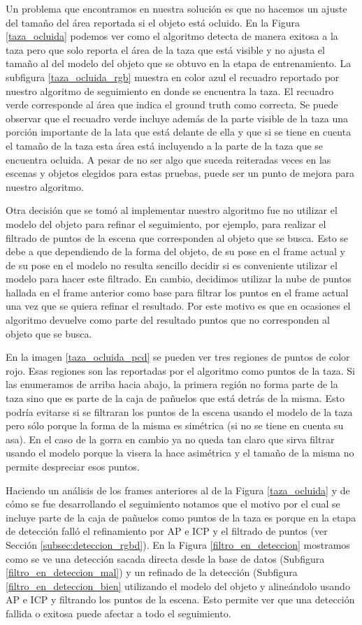 Un problema que encontramos en nuestra solución es que no hacemos un ajuste del tamaño del área reportada si el objeto está ocluido. En la Figura \ref{taza_ocluida} podemos ver como el algoritmo detecta de manera exitosa a la taza pero que solo reporta el área de la taza que está visible y no ajusta el tamaño al del modelo del objeto que se obtuvo en la etapa de entrenamiento. La subfigura \ref{taza_ocluida_rgb} muestra en color azul el recuadro reportado por nuestro algoritmo de seguimiento en donde se encuentra la taza. El recuadro verde corresponde al área que indica el ground truth como correcta. Se puede observar que el recuadro verde incluye además de la parte visible de la taza una porción importante de la lata que está delante de ella y que si se tiene en cuenta el tamaño de la taza esta área está incluyendo a la parte de la taza que se encuentra ocluida. A pesar de no ser algo que suceda reiteradas veces en las escenas y objetos elegidos para estas pruebas, puede ser un punto de mejora para nuestro algoritmo.

Otra decisión que se tomó al implementar nuestro algoritmo fue no utilizar el modelo del objeto para refinar el seguimiento, por ejemplo, para realizar el filtrado de puntos de la escena que corresponden al objeto que se busca. Esto se debe a que dependiendo de la forma del objeto, de su pose en el frame actual y de su pose en el modelo no resulta sencillo decidir si es conveniente utilizar el modelo para hacer este filtrado. En cambio, decidimos utilizar la nube de puntos hallada en el frame anterior como base para filtrar los puntos en el frame actual una vez que se quiera refinar el resultado. Por este motivo es que en ocasiones el algoritmo devuelve como parte del resultado puntos que no corresponden al objeto que se busca.

En la imagen \ref{taza_ocluida_pcd} se pueden ver tres regiones de puntos de color rojo. Esas regiones son las reportadas por el algoritmo como puntos de la taza. Si las enumeramos de arriba hacia abajo, la primera región no forma parte de la taza sino que es parte de la caja de pañuelos que está detrás de la misma. Esto podría evitarse si se filtraran los puntos de la escena usando el modelo de la taza pero sólo porque la forma de la misma es simétrica (si no se tiene en cuenta su asa). En el caso de la gorra en cambio ya no queda tan claro que sirva filtrar usando el modelo porque la visera la hace asimétrica y el tamaño de la misma no permite despreciar esos puntos.

Haciendo un análisis de los frames anteriores al de la Figura \ref{taza_ocluida} y de cómo se fue desarrollando el seguimiento notamos que el motivo por el cual se incluye parte de la caja de pañuelos como puntos de la taza es porque en la etapa de detección falló el refinamiento por AP e ICP y el filtrado de puntos (ver Sección \ref{subsec:deteccion_rgbd}). En la Figura \ref{filtro_en_deteccion} mostramos como se ve una detección sacada directa desde la base de datos (Subfigura \ref{filtro_en_deteccion_mal}) y un refinado de la detección (Subfigura \ref{filtro_en_deteccion_bien} utilizando el modelo del objeto y alineándolo usando AP e ICP y filtrando los puntos de la escena. Esto permite ver que una detección fallida o exitosa puede afectar a todo el seguimiento.

